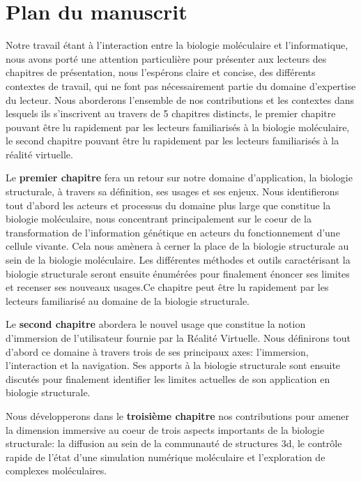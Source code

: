 \section*{Plan du manuscrit}

Notre travail étant à l'interaction entre la biologie moléculaire et l'informatique, nous avons porté une attention particulière pour présenter aux lecteurs des chapitres de présentation, nous l'espérons claire et concise, des différents contextes de travail, qui ne font pas nécessairement partie du domaine d'expertise du lecteur. Nous aborderons l'ensemble de nos contributions et les contextes dans lesquels ils s'inscrivent au travers de 5 chapitres distincts, le premier chapitre pouvant être lu rapidement par les lecteurs familiarisés à la biologie moléculaire, le second chapitre pouvant être lu rapidement par les lecteurs familiarisés à la réalité virtuelle.

Le \textbf{premier chapitre} fera un retour sur notre domaine d'application, la biologie structurale, à travers sa définition, ses usages et ses enjeux. Nous identifierons tout d'abord les acteurs et processus du domaine plus large que constitue la biologie moléculaire, nous concentrant principalement sur le coeur de la transformation de l'information génétique en acteurs du fonctionnement d'une cellule vivante. Cela nous amènera à cerner la place de la biologie structurale au sein de la biologie moléculaire. Les différentes méthodes et outils caractérisant la biologie structurale seront ensuite énumérées pour finalement énoncer ses limites et recenser ses nouveaux usages.Ce chapitre peut être lu rapidement par les lecteurs familiarisé au domaine de la biologie structurale.

Le \textbf{second chapitre} abordera le nouvel usage que constitue la notion d'immersion de l'utilisateur fournie par la Réalité Virtuelle. Nous définirons tout d'abord ce domaine à travers trois de ses principaux axes: l'immersion, l'interaction et la navigation. Ses apports à la biologie structurale sont ensuite discutés pour finalement identifier les limites actuelles de son application en biologie structurale.

Nous développerons dans le \textbf{troisième chapitre} nos contributions pour amener la dimension immersive au coeur de trois aspects importants de la biologie structurale: la diffusion au sein de la communauté de structures 3d, le contrôle rapide de l'état d'une simulation numérique moléculaire et l'exploration de complexes moléculaires.

